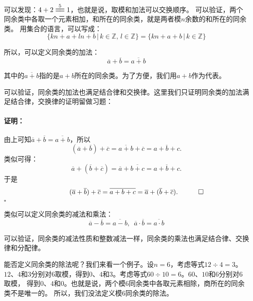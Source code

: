 \documentclass[12pt,UTF8]{ctexbook}
\theoremstyle{definition}
\theoremstyle{plain}
\renewenvironment{proof}{\paragraph{\textbf{证明：}}}{\hfill$\square$}
\newcommand{\tong}[1]{\overset{#1}{\equiv\joinrel\equiv}}
\begin{document}
可以发现：$ 4 + 2 \tong{5} 1$，也就是说，取模和加法可以交换顺序。
可以验证，两个同余类中各取一个元素相加，和所在的同余类，就是两者模$n$余数的和所在的同余类。
用集合的语言，可以写成：
$$\{kn + a + ln + b \, | \, k\in\mathbb{Z}, \, l\in\mathbb{Z} \} = \{kn + a + b \, | \, k\in\mathbb{Z} \}$$

所以，可以定义同余类的加法：
$$ \overline{a} + \overline{b} = \overline{a + b}$$

其中的$\overline{a + b}$指的是$a+b$所在的同余类。为了方便，我们用$a + b$作为代表。

可以验证，同余类的加法也满足结合律和交换律。这里我们只证明同余类的加法满足结合律，交换律的证明留做习题：

\begin{proof}
    由上可知$ \overline{a} + \overline{b} = \overline{a + b}$，所以
    $$ (\overline{a} + \overline{b}) + \overline{c} = \overline{a + b}+ \overline{c} = \overline{a + b + c}.$$
    类似可得：
    $$ \overline{a} + (\overline{b} + \overline{c}) = \overline{a}+ \overline{b + c} = \overline{a + b + c}.$$
    于是
    $$ \quad \quad \quad (\overline{a} + \overline{b}) + \overline{c}  = \overline{a + b + c} = \overline{a} + (\overline{b} + \overline{c}). \quad \qedhere$$
\end{proof}

类似可以定义同余类的减法和乘法：
$$ \overline{a} - \overline{b} = \overline{a - b}, \,\,\, \overline{a} \cdot \overline{b} = \overline{a \cdot b}$$

可以验证，同余类的减法性质和整数减法一样，同余类的乘法也满足结合律、交换律和分配律。

能否定义同余类的除法呢？我们来看一个例子。设$n=6$，考虑等式$12 \div 4 = 3$。
$12$、$4$和$3$分别对$6$取模，得到$0$、$4$和$3$。考虑等式$60 \div 10 = 6$。$60$、$10$和$6$分别对$6$取模，
得到$0$、$4$和$0$。也就是说，两个模$6$同余类中各取元素相除，商所在的同余类不是唯一的。
所以，我们没法定义模$6$同余类的除法。
\end{document}
